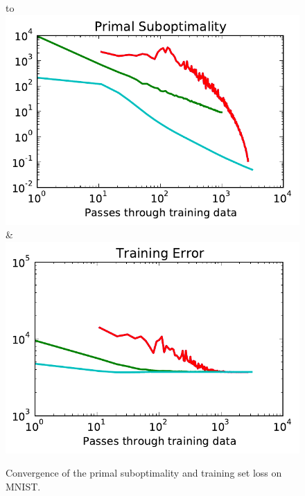 \begin{figure}
    \begin{tabu} to 
    \\[-3mm]
    \includegraphics[width=\linewidth]{evaluation/images/mnist}&%
    \includegraphics[width=\linewidth]{evaluation/images/mnist_loss}
    \end{tabu}
\caption{%
   Convergence of the primal suboptimality and training set loss on MNIST. 
}
\end{figure}

